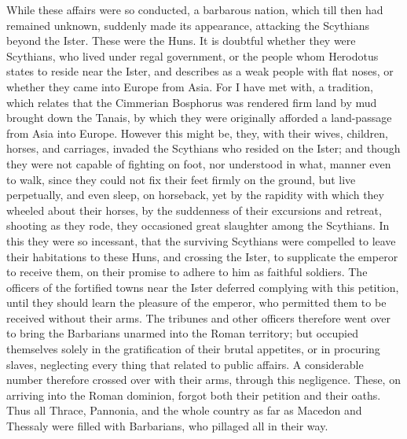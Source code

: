 While these affairs were so conducted, a barbarous nation, which till then had remained unknown, suddenly made its appearance, attacking the Scythians beyond the Ister. These were the Huns. It is doubtful whether they were Scythians, who lived under regal government, or the people whom Herodotus states to reside near the Ister, and describes as a weak people with flat noses, or whether they came into Europe from Asia. For I have met with, a tradition, which relates that the Cimmerian Bosphorus was rendered firm land by mud brought down the Tanais, by which they were originally afforded a land-passage from Asia into Europe. However this might be, they, with their wives, children, horses, and carriages, invaded the Scythians who resided on the Ister; and though they were not capable of fighting on foot, nor understood in what, manner even to walk, since they could not fix their feet firmly on the ground, but live perpetually, and even sleep, on horseback, yet by the rapidity with which they wheeled about their horses, by the suddenness of their excursions and retreat, shooting as they rode, they occasioned great slaughter among the Scythians. In this they were so incessant, that the surviving Scythians were compelled to leave their habitations to these Huns, and crossing the Ister, to supplicate the emperor to receive them, on their promise to adhere to him as faithful soldiers. The officers of the fortified towns near the Ister deferred complying with this petition, until they should learn the pleasure of the emperor, who permitted them to be received without their arms. The tribunes and other officers therefore went over to bring the Barbarians unarmed into the Roman territory; but occupied themselves solely in the gratification of their brutal appetites, or in procuring slaves, neglecting every thing that related to public affairs. A considerable number therefore crossed over with their arms, through this negligence. These, on arriving into the Roman dominion, forgot both their petition and their oaths. Thus all Thrace, Pannonia, and the whole country as far as Macedon and Thessaly were filled with Barbarians, who pillaged all in their way.

